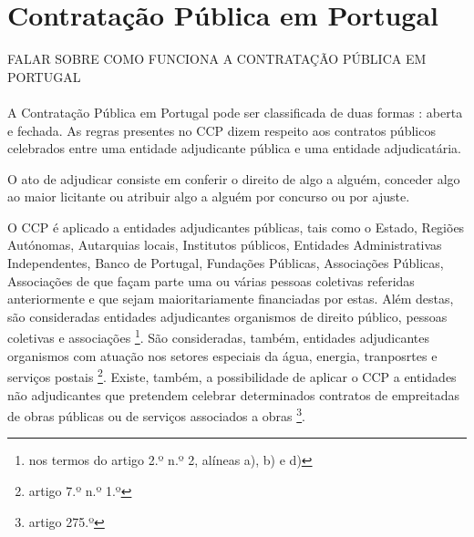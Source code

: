 \section{Contratação Pública em Portugal}



FALAR SOBRE COMO FUNCIONA A CONTRATAÇÃO PÚBLICA EM PORTUGAL
\\
\\


A Contratação Pública em Portugal pode ser classificada de duas formas : aberta e fechada. As regras presentes no CCP dizem respeito aos contratos públicos celebrados entre uma entidade adjudicante pública e uma entidade adjudicatária.



O ato de adjudicar consiste em conferir o direito de algo a alguém, conceder algo ao maior licitante ou atribuir algo a alguém por concurso ou por ajuste. 

O CCP é aplicado a entidades adjudicantes públicas, tais como o Estado, Regiões Autónomas, Autarquias locais, Institutos públicos, Entidades Administrativas Independentes, Banco de Portugal, Fundações Públicas, Associações Públicas, Associações de que façam parte uma ou várias pessoas coletivas referidas anteriormente e que sejam maioritariamente financiadas por estas. Além destas, são consideradas entidades adjudicantes organismos de direito público, pessoas coletivas e associações \footnote{nos termos do artigo 2.º n.º 2, alíneas a), b) e d)}. São consideradas, também, entidades adjudicantes organismos com atuação nos setores especiais da água, energia, tranposrtes e serviços postais \footnote{artigo 7.º n.º 1.º}. Existe, também, a possibilidade de aplicar o CCP a entidades não adjudicantes que pretendem celebrar determinados contratos de empreitadas de obras públicas ou de serviços associados a obras \footnote{artigo 275.º}.





